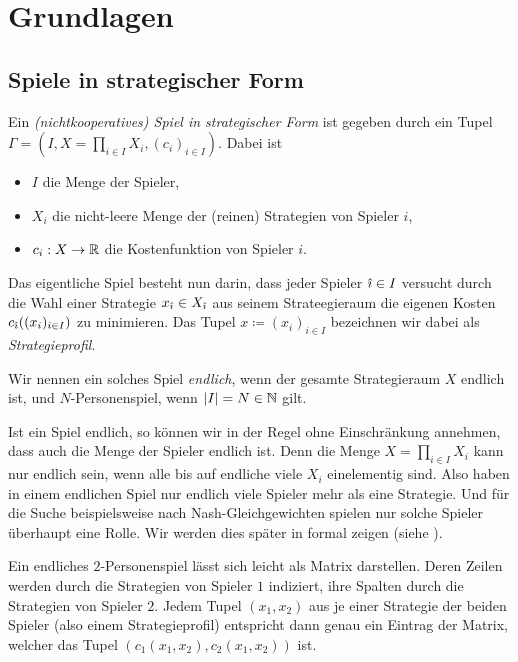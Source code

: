 \section{Grundlagen}\label{sec:Grundlagen}

\subsection{Spiele in strategischer Form}

\begin{defn}
	Ein \emph{(nichtkooperatives) Spiel in strategischer Form} ist gegeben durch ein Tupel $\Gamma = (I, X = \prod_{i\in I} X_i, (c_i)_{i\in I})$. Dabei ist
	\begin{itemize}
		\item $I$ die Menge der Spieler,
		\item $X_i$ die nicht-leere Menge der (reinen) Strategien von Spieler $i$,
		\item $c_i: X \to \mathbb{R}$ die Kostenfunktion von Spieler $i$.
	\end{itemize}
	Das eigentliche Spiel besteht nun darin, dass jeder Spieler ${\hat{\imath}} \in I$ versucht durch die Wahl einer Strategie $x_{\hat{\imath}} \in X_{\hat{\imath}}$ aus seinem Strateegieraum die eigenen Kosten $c_{\hat{\imath}}((x_i)_{i \in I})$ zu minimieren. Das Tupel $x \coloneqq (x_i)_{i \in I}$ bezeichnen wir dabei als \emph{Strategieprofil}.
	
	Wir nennen ein solches Spiel \emph{endlich}, wenn der gesamte Strategieraum $X$ endlich ist, und $N$-Personenspiel, wenn $\left|I\right| = N \in \mathbb{N}$ gilt.
\end{defn}

\begin{beob}\label{beob:endlicheSpiele}
	Ist ein Spiel endlich, so können wir in der Regel ohne Einschränkung annehmen, dass auch die Menge der Spieler endlich ist. Denn die Menge $X = \prod_{i\in I} X_i$ kann nur endlich sein, wenn alle bis auf endliche viele $X_i$ einelementig sind. Also haben in einem endlichen Spiel nur endlich viele Spieler mehr als eine Strategie. Und für die Suche beispielsweise nach Nash-Gleichgewichten spielen nur solche Spieler überhaupt eine Rolle. Wir werden dies später in  formal zeigen (siehe ).
\end{beob}

\begin{notation}
	Ein endliches $2$-Personenspiel lässt sich leicht als Matrix darstellen. Deren Zeilen werden durch die Strategien von Spieler $1$ indiziert, ihre Spalten durch die Strategien von Spieler $2$. Jedem Tupel $(x_1, x_2)$ aus je einer Strategie der beiden Spieler (also einem Strategieprofil) entspricht dann genau ein Eintrag der Matrix, welcher das Tupel $(c_1(x_1, x_2), c_2(x_1, x_2))$ ist.
\end{notation}

